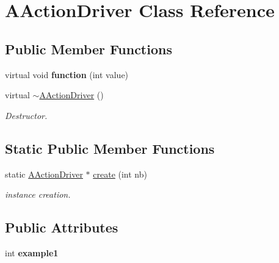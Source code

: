 \hypertarget{classAActionDriver}{}\section{A\+Action\+Driver Class Reference}
\label{classAActionDriver}
\subsection*{Public Member Functions}
\begin{DoxyCompactItemize}
\item 
\mbox{\label{classAActionDriver_a2bcdc31f70d9648f2496f5b8a8b7683c}} 
virtual void {\bfseries function} (int value)
\item 
\mbox{\label{classAActionDriver_ab55710feabfd3807c16427f9fa88d762}} 
virtual \hyperlink{classAActionDriver_ab55710feabfd3807c16427f9fa88d762}{$\sim$\+A\+Action\+Driver} ()
\begin{DoxyCompactList}\small\item\em Destructor. \end{DoxyCompactList}\end{DoxyCompactItemize}
\subsection*{Static Public Member Functions}
\begin{DoxyCompactItemize}
\item 
\mbox{\label{classAActionDriver_a2ef1e625e85a9598b119e004d2cf5f81}} 
static \hyperlink{classAActionDriver}{A\+Action\+Driver} $\ast$ \hyperlink{classAActionDriver_a2ef1e625e85a9598b119e004d2cf5f81}{create} (int nb)
\begin{DoxyCompactList}\small\item\em instance creation. \end{DoxyCompactList}\end{DoxyCompactItemize}
\subsection*{Public Attributes}
\begin{DoxyCompactItemize}
\item 
\mbox{\label{classAActionDriver_ad5e7d0a6931716d35d0d149da6a1a555}} 
int {\bfseries example1}
\end{DoxyCompactItemize}
